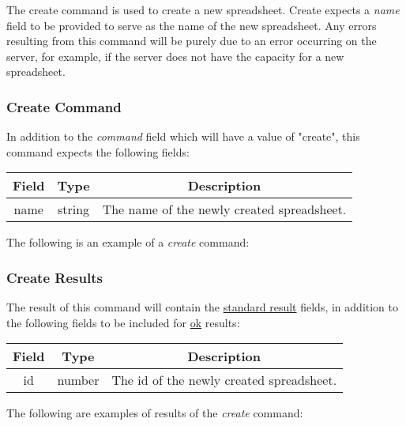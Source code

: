 The create command is used to create a new spreadsheet. Create expects a \emph{name} 
field to be provided to serve as the name of the new spreadsheet. Any errors 
resulting from this command will be purely due to an error occurring on the 
server, for example, if the server does not have the capacity for a new 
spreadsheet.

\subsubsection{Create Command}

In addition to the \emph{command} field which will have a value of "create", this command expects the following fields:
\begin{table}[H]
    \begin{center}
        \begin{tabular}{|c|c|c|}\hline
            Field & Type & Description \\\hline
            name & string & The name of the newly created spreadsheet. \\\hline
        \end{tabular}
    \end{center}
\end{table}

The following is an example of a \emph{create} command:


\subsubsection{Create Results}
The result of this command will contain the \hyperref[sec:message:result]{standard result} fields, in addition to the following fields to be included for \underline{ok} results:
\begin{table}[H]
    \begin{center}
        \begin{tabular}{|c|c|c|}\hline
            Field & Type & Description \\\hline
            id & number & The id of the newly created spreadsheet. \\\hline
        \end{tabular}
    \end{center}
\end{table}

The following are examples of results of the \emph{create} command:




